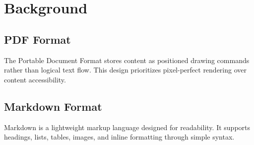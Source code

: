 \documentclass[12pt]{report}
\begin{document}
\chapter{Background}
\section{PDF Format}
The Portable Document Format stores content as positioned drawing commands rather
than logical text flow. This design prioritizes pixel-perfect rendering over
content accessibility.

\section{Markdown Format}
Markdown is a lightweight markup language designed for readability. It supports
headings, lists, tables, images, and inline formatting through simple syntax.
\end{document}
